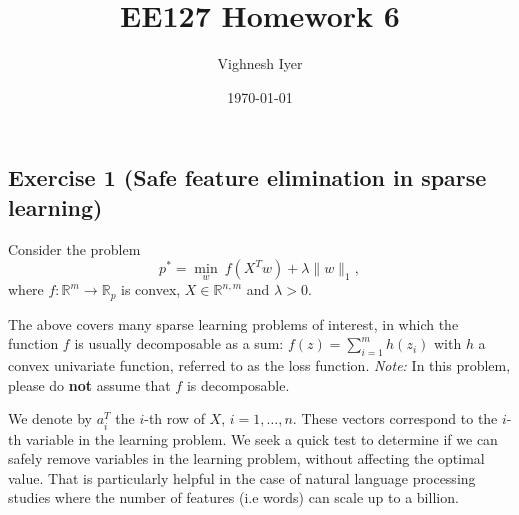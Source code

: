 \documentclass[11pt]{article}
\begin{document}
\title{EE127 Homework 6}
\author{Vighnesh Iyer}
\date{\today}
\maketitle

\subsection*{Exercise 1 (Safe feature elimination in sparse learning)}

Consider the problem
\[
p^* = \min_w \: f(X^T w) + \lambda \|w\|_1,
\]
where $f : \mathbb{R}^{m} \rightarrow \mathbb{R}_{p}$ is convex, $X \in \mathbb{R}^{n,m}$ and $\lambda >0$.

The above covers many sparse learning problems of interest, in which the function $f$ is usually decomposable as a sum: $f(z) = \sum_{i=1}^m h(z_i)$  with $h$ a convex univariate function, referred to as the loss function. \textit{Note:} In this problem, please do \textbf{not} assume that $f$ is decomposable.

We denote by $a_i^T$ the $i$-th row of $X$, $i=1,\ldots,n$. These vectors correspond to the $i$-th variable in the learning problem. We seek a quick test to determine if we can safely remove variables in the learning problem, without affecting the optimal value. That is particularly helpful in the case of natural language processing studies where the number of features (i.e words) can scale up to a billion.
\end{document}
